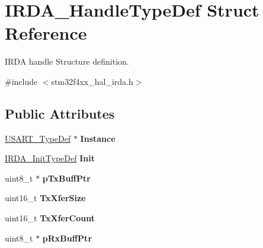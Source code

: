 \hypertarget{struct_i_r_d_a___handle_type_def}{}\section{I\+R\+D\+A\+\_\+\+Handle\+Type\+Def Struct Reference}
\label{struct_i_r_d_a___handle_type_def}


I\+R\+DA handle Structure definition.  




{\ttfamily \#include $<$stm32f4xx\+\_\+hal\+\_\+irda.\+h$>$}

\subsection*{Public Attributes}
\begin{DoxyCompactItemize}
\item 
\hyperlink{struct_u_s_a_r_t___type_def}{U\+S\+A\+R\+T\+\_\+\+Type\+Def} $\ast$ {\bfseries Instance}\hypertarget{struct_i_r_d_a___handle_type_def_a682ac53b57d43e6004af0268dadcfdee}{}\label{struct_i_r_d_a___handle_type_def_a682ac53b57d43e6004af0268dadcfdee}

\item 
\hyperlink{struct_i_r_d_a___init_type_def}{I\+R\+D\+A\+\_\+\+Init\+Type\+Def} {\bfseries Init}\hypertarget{struct_i_r_d_a___handle_type_def_a87a20862793eb10c8ac858de01aef103}{}\label{struct_i_r_d_a___handle_type_def_a87a20862793eb10c8ac858de01aef103}

\item 
uint8\+\_\+t $\ast$ {\bfseries p\+Tx\+Buff\+Ptr}\hypertarget{struct_i_r_d_a___handle_type_def_a294a65b12817cc46a35f77ebd0d2fec3}{}\label{struct_i_r_d_a___handle_type_def_a294a65b12817cc46a35f77ebd0d2fec3}

\item 
uint16\+\_\+t {\bfseries Tx\+Xfer\+Size}\hypertarget{struct_i_r_d_a___handle_type_def_a6fa292e15cf7759993991f82d742883c}{}\label{struct_i_r_d_a___handle_type_def_a6fa292e15cf7759993991f82d742883c}

\item 
uint16\+\_\+t {\bfseries Tx\+Xfer\+Count}\hypertarget{struct_i_r_d_a___handle_type_def_ae55fdd62b6b2057afed9be82996b6b6f}{}\label{struct_i_r_d_a___handle_type_def_ae55fdd62b6b2057afed9be82996b6b6f}

\item 
uint8\+\_\+t $\ast$ {\bfseries p\+Rx\+Buff\+Ptr}\hypertarget{struct_i_r_d_a___handle_type_def_a7096201311de81867db106c711c9befe}{}\label{struct_i_r_d_a___handle_type_def_a7096201311de81867db106c711c9befe}


\end{DoxyCompactItemize}
